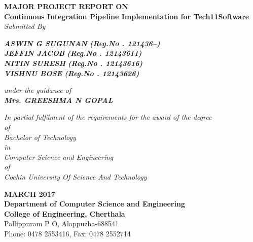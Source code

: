 \documentclass[12pt,a4paper,oneside]{report}
\begin{document}
\begin{titlepage}
\begin{center}

\large{\textbf{MAJOR PROJECT REPORT ON}}\\

\LARGE{\textbf{Continuous Integration Pipeline Implementation for Tech11Software}}\\

\Large{\textit{Submitted By }}\\
\begin{singlespace}
\Large{\textit{\textbf{ASWIN G SUGUNAN }\textbf{(Reg.No . 121436--)}}} \\
\Large{\textit{\textbf{JEFFIN JACOB  }\textbf{(Reg.No . 12143611)}}} \\
\Large{\textit{\textbf{NITIN SURESH }\textbf{(Reg.No . 12143616)}}} \\
\Large{\textit{\textbf{VISHNU BOSE }\textbf{(Reg.No . 12143626)}}} \\

\end{singlespace}
\Large{\textit{\textit{under the guidance of}}}\\
\Large{\textit{\textbf{Mrs. GREESHMA N GOPAL}}}\\
\begin{singlespace}
\small{\textit{In partial fulfilment of the requirements for the award of the degree}\\
\small{ \textit{of}}\\
\small{\textit{Bachelor of Technology} }\\
\small{\textit{in}}\\
\small{\textit{Computer Science and Engineering}}\\
\small{\textit{of}}\\
\small{\textit{Cochin University Of Science And Technology}}}\\
\end{singlespace}
\begin{singlespace}
\begin{figure}[h]
\begin{center}
\end{center}
\end{figure}
\end{singlespace}
\begin{singlespace}

\Large{{\textbf{MARCH 2017\\Department of Computer Science and Engineering\\College of Engineering, Cherthala}\\
Pallippuram P O, Alappuzha-688541 \\Phone: 0478 2553416, Fax: 0478 2552714}}
\end{singlespace}
\end{center}
\end{titlepage}
\end{document}
